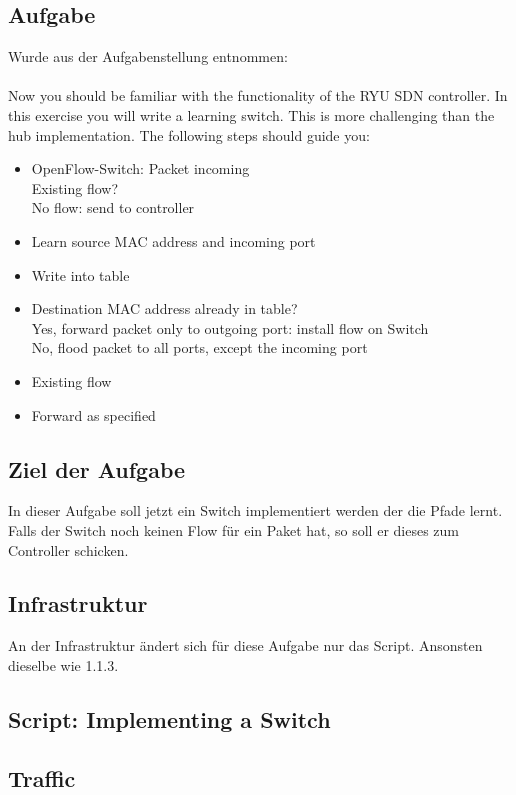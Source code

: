 \documentclass[a4,12pt]{scrartcl}
\begin{document}
\subsection{Aufgabe}
Wurde aus der Aufgabenstellung entnommen: \\
\\
Now you should be familiar with the functionality of the RYU SDN controller. In this exercise you will write a learning switch. This is more challenging than the hub implementation. The following steps should guide you:
\begin{itemize}
\item OpenFlow-Switch: Packet incoming\\
Existing flow?\\
No flow: send to controller
\item Learn source MAC address and incoming port
\item Write into table
\item  Destination MAC address already in table?\\
Yes, forward packet only to outgoing port: install flow on Switch\\
No, flood packet to all ports, except the incoming port
\item Existing flow
\item Forward as specified
\end{itemize}

\subsection{Ziel der Aufgabe}
In dieser Aufgabe soll jetzt ein Switch implementiert werden der die Pfade lernt. Falls der Switch noch keinen Flow für ein Paket hat, so soll er dieses zum Controller schicken. 

\subsection{Infrastruktur}
An der Infrastruktur ändert sich für diese Aufgabe nur das Script. Ansonsten dieselbe wie 1.1.3.

\subsection{Script: Implementing a Switch}

\subsection{Traffic}
\end{document}

